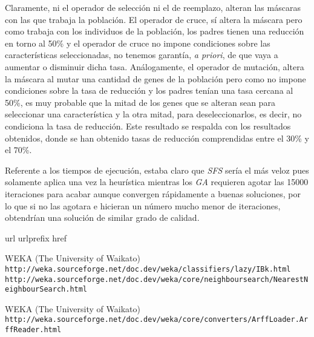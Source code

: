 \documentclass[a4paper, 11pt]{article}
\begin{document}
			Claramente, ni el operador de selección ni el de reemplazo, alteran las máscaras con las
			que trabaja la población. El operador de cruce, sí altera la máscara pero como trabaja con
			los individuos de la población, los padres tienen una reducción en torno al 50\% y el
			operador de cruce no impone condiciones sobre las características seleccionadas, no tenemos
			garantía, \textit{a priori}, de que vaya a aumentar o disminuir dicha tasa. Análogamente,
			el operador de mutación, altera la máscara al mutar una cantidad de genes de la población
			pero como no impone condiciones sobre la tasa de reducción y los padres tenían una tasa
			cercana al 50\%, es muy probable que la mitad de los genes que se alteran sean para seleccionar
			una característica y la otra mitad, para deseleccionarlos, es decir, no condiciona la tasa
			de reducción. Este resultado se respalda con los resultados obtenidos, donde se han obtenido
			tasas de reducción comprendidas entre el 30\% y el 70\%.
			
			Referente a los tiempos de ejecución, estaba claro que \textit{SFS} sería el más veloz pues
			solamente aplica una vez la heurística mientras los \textit{GA} requieren agotar las 15000
			iteraciones para acabar aunque convergen rápidamente a buenas soluciones, por lo que si no
			las agotara e hicieran un número mucho menor de iteraciones, obtendrían una solución de
			similar grado de calidad.
		
	
	\newpage
	
	\begin{thebibliography}{10}
	\expandafter\ifx\csname url\endcsname\relax
	  \def\url#1{\texttt{#1}}\fi
	\expandafter\ifx\csname urlprefix\endcsname\relax\def\urlprefix{URL }\fi
	\expandafter\ifx\csname href\endcsname\relax
	  \def\href#1#2{#2} \def\path#1{#1}\fi
	
	WEKA (The University of Waikato)\\
	  \url{http://weka.sourceforge.net/doc.dev/weka/classifiers/lazy/IBk.html}\\
	  \url{http://weka.sourceforge.net/doc.dev/weka/core/neighboursearch/NearestNeighbourSearch.html}
	  
  	WEKA (The University of Waikato)\\
	  \url{http://weka.sourceforge.net/doc.dev/weka/core/converters/ArffLoader.ArffReader.html}
	  
	\end{thebibliography}
\end{document}
